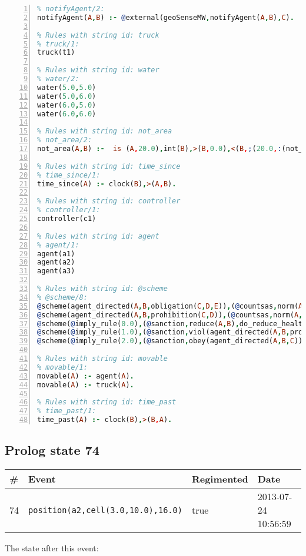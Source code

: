 \documentclass[11pt]{article}\usepackage[utf8]{inputenc}\usepackage{geometry}
\begin{document}
\begin{lstlisting}[language=Prolog, numbers=left]
% Rules with string id: notifyAgent
% notifyAgent/2:
notifyAgent(A,B) :- @external(geoSenseMW,notifyAgent(A,B),C).

% Rules with string id: truck
% truck/1:
truck(t1)

% Rules with string id: water
% water/2:
water(5.0,5.0)
water(5.0,6.0)
water(6.0,5.0)
water(6.0,6.0)

% Rules with string id: not_area
% not_area/2:
not_area(A,B) :-  is (A,20.0),int(B),>(B,0.0),<(B,;(20.0,:(not_area(A,B), is (-(B),20.0)))),int(A),>(A,0.0),<(A,;(20.0,:(area(A,B),-(int(A))))),int(B),>(A,0.0),>(B,0.0),<(A,21.0),<(B,21.0).

% Rules with string id: time_since
% time_since/1:
time_since(A) :- clock(B),>(A,B).

% Rules with string id: controller
% controller/1:
controller(c1)

% Rules with string id: agent
% agent/1:
agent(a1)
agent(a2)
agent(a3)

% Rules with string id: @scheme
% @scheme/8:
@scheme(agent_directed(A,B,obligation(C,D,E)),(@countsas,norm(A,B,F,obligation(C,D,E)),F),false,(listTrue(C)),(time_past(D)),false,[plus(viol(agent_directed(A,B,obligation(C,D,E))))|[]],[plus(obey(agent_directed(A,B,obligation(C,D,E))))|[]])
@scheme(agent_directed(A,B,prohibition(C,D)),(@countsas,norm(A,B,E,prohibition(C,D)),E),(listTrue(C)),false,(false),false,[plus(viol(agent_directed(A,B,prohibition(C,D))))|[]],[plus(obey(agent_directed(A,B,prohibition(C,D))))|[]])
@scheme(@imply_rule(0.0),(@sanction,reduce(A,B),do_reduce_health(A,B),notifyAgent(A,changed(status))),true,false,false,false,[min(reduce(A,B))|[]],[])
@scheme(@imply_rule(1.0),(@sanction,viol(agent_directed(A,B,prohibition(C,D))),do_sanction(D)),true,false,false,false,[min(viol(agent_directed(A,B,prohibition(C,D))))|[]],[])
@scheme(@imply_rule(2.0),(@sanction,obey(agent_directed(A,B,C))),true,false,false,false,[min(obey(agent_directed(A,B,C)))|[]],[])

% Rules with string id: movable
% movable/1:
movable(A) :- agent(A).
movable(A) :- truck(A).

% Rules with string id: time_past
% time_past/1:
time_past(A) :- clock(B),>(B,A).

\end{lstlisting}
\clearpage 
\subsection{Prolog state 74}
\begin{table}[ht]
\centering 
\begin{tabular}{l l l l} 
\textbf{\#} & \textbf{Event} & \textbf{Regimented} & \textbf{Date} \\ [0.5ex] 
\hline
74&\texttt{position(a2,cell(3.0,10.0),16.0)}&true&2013-07-24 10:56:59\\ [1ex] \hline\end{tabular}
\end{table}
The state after this event:
\end{document}
